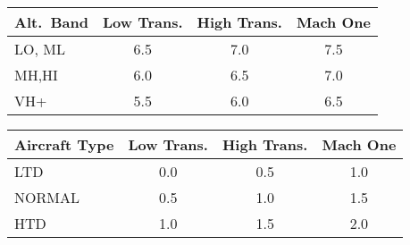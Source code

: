 
\begin{onecolumntablefloat}[p]
\begin{onecolumntable}
\begin{tabularx}{1.0\linewidth}{Xccc}
\toprule
Alt.\ Band&Low Trans.&High Trans.&Mach One\\
\midrule
LO, ML&6.5&7.0&7.5\\
MH,HI&6.0&6.5&7.0\\
VH+&5.5&6.0&6.5\\
\bottomrule
\end{tabularx}
\end{onecolumntable}
\end{onecolumntablefloat}

\begin{onecolumntablefloat}[p]
\begin{onecolumntable}
\begin{tabularx}{1.0\linewidth}{Xccc}
\toprule
Aircraft Type&Low Trans.&High Trans.&Mach One\\
\midrule
LTD&0.0&0.5&1.0\\
NORMAL&0.5&1.0&1.5\\
HTD&1.0&1.5&2.0\\
\bottomrule
\end{tabularx}
\end{onecolumntable}
\end{onecolumntablefloat}

